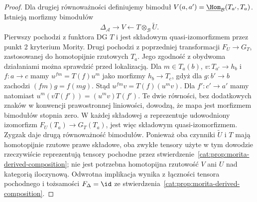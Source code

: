 \begin{proof}
Dla drugiej równoważności definiujemy bimoduł $V(a,a')=\underline{\Hom}_{\mathcal B}(T_{a'},T_a)$. Istnieją morfizmy bimodułów
\[
 \Delta_{\mathcal A}\longrightarrow V
 \longleftarrow T\otimes_{\mathcal B}\widetilde U.
\]
Pierwszy pochodzi z funktora DG $T$ i jest składowym quasi-izomorfizmem przez punkt 2 kryterium Mority. Drugi pochodzi z poprzedniej transformacji $F_U\to G_T$, zastosowanej do homotopijnie rzutowych $T_a$. Jego zgodność z obydwoma działaniami można sprawdzić przed lokalizacją. Dla $m\in T_a(b)$, $v:T_{a'}\to h_b$ i $f:a\to c$ mamy $u^{fm}=T(f)u^m$ jako morfizmy $h_b\to T_c$, gdyż dla $g:b'\to b$ zachodzi $(fm)g=f(mg)$. Stąd $u^{fm}v=T(f)(u^mv)$. Dla $f':c'\to a'$ mamy natomiast $u^m(vT(f'))=(u^mv)T(f')$. Te dwie równości, bez dodatkowych znaków w konwencji prawostronnej liniowości, dowodzą, że mapa jest morfizmem bimodułów stopnia zero. W każdej składowej $a$ reprezentuje udowodniony izomorfizm $F_U(T_a)\to G_T(T_a)$, jest więc składowym quasi-izomorfizmem. Zygzak daje drugą równoważność bimodułów. Ponieważ oba czynniki $\widetilde U$ i $T$ mają homotopijnie rzutowe prawe składowe, oba zwykłe tensory użyte w tym dowodzie rzeczywiście reprezentują tensory pochodne przez stwierdzenie~\ref{cat:prop:morita-derived-composition}; nie jest potrzebna homotopijna rzutowość $V$ ani $U$ nad kategorią iloczynową. Odwrotna implikacja wynika z łączności tensora pochodnego i tożsamości $F_{\Delta}=\id$ ze stwierdzenia~\ref{cat:prop:morita-derived-composition}.
\end{proof}

